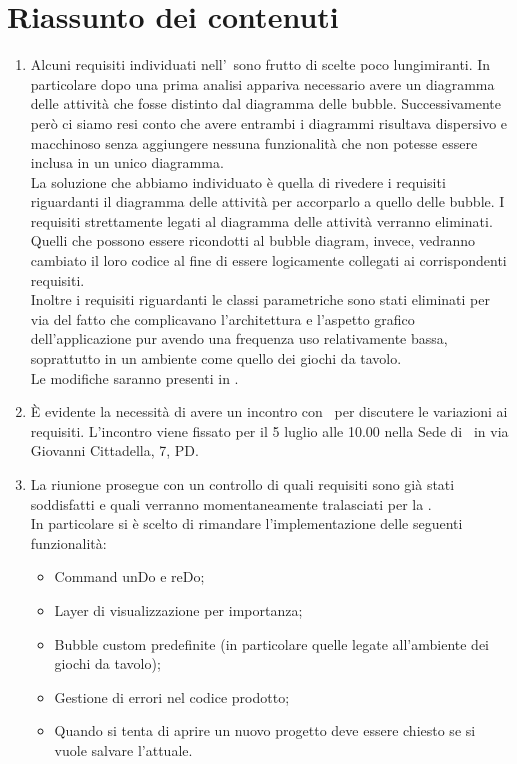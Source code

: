 \documentclass[../AnalisiDeiRequisiti.tex]{subfiles}
\begin{document}
		\section*{Riassunto dei contenuti}
		\begin{enumerate}
		\item Alcuni requisiti individuati nell'\analisideirequisiti\ sono frutto di scelte poco lungimiranti. In particolare dopo una prima analisi appariva necessario avere un diagramma delle attività che fosse distinto dal diagramma delle bubble. Successivamente però ci siamo resi conto che avere entrambi i diagrammi risultava dispersivo e macchinoso senza aggiungere nessuna funzionalità che non potesse essere inclusa in un unico diagramma. \\La soluzione che abbiamo individuato è quella di rivedere i requisiti riguardanti il diagramma delle attività per accorparlo a quello delle bubble. I requisiti strettamente legati al diagramma delle attività verranno eliminati. Quelli che possono essere ricondotti al bubble diagram, invece, vedranno cambiato il loro codice al fine di essere logicamente collegati ai corrispondenti requisiti.\\
		Inoltre i requisiti riguardanti le classi parametriche sono stati eliminati per via del fatto che complicavano l'architettura e l'aspetto grafico dell'applicazione pur avendo una frequenza uso relativamente bassa, soprattutto in un ambiente come quello dei giochi da tavolo.\\
		Le modifiche saranno presenti in \analisideirequisitiv.
		\item È evidente la necessità di avere un incontro con \proponente\ per discutere le variazioni ai requisiti. L'incontro viene fissato per il 5 luglio alle 10.00 nella Sede di \proponente\ in via Giovanni Cittadella, 7, PD.
		\item La riunione prosegue con un controllo di quali requisiti sono già stati soddisfatti e quali verranno momentaneamente tralasciati per la \revisionediqualifica.\\
		In particolare si è scelto di rimandare l'implementazione delle seguenti funzionalità:
		\begin{itemize}
			\item Command unDo e reDo;
			\item Layer di visualizzazione per importanza;
			\item Bubble custom predefinite (in particolare quelle legate all'ambiente dei giochi da tavolo);
			\item Gestione di errori nel codice prodotto;
			\item Quando si tenta di aprire un nuovo progetto deve essere chiesto se si vuole salvare l'attuale.
		\end{itemize}
		\end{enumerate}
\end{document}
